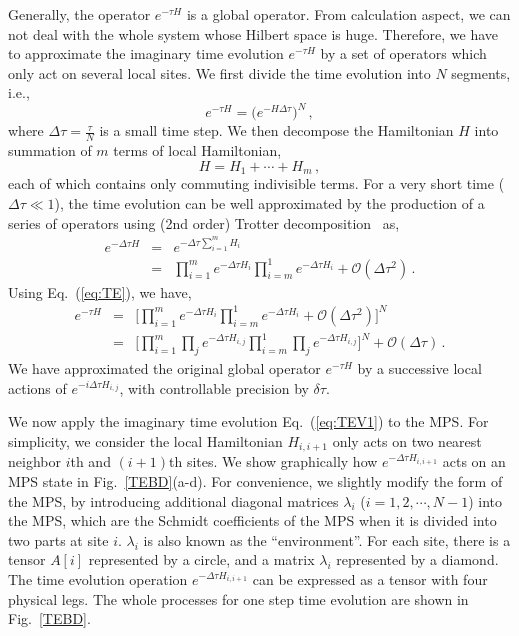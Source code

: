 \documentclass[preprint,3p,times,preprint,showpacs,amsmath,superscriptaddress,floatfix]{elsarticle}
\begin{document}
Generally, the operator $e^{-\tau H}$ is a global operator.
From calculation aspect, we can not deal with the whole system whose Hilbert space is huge. Therefore, we have to approximate the imaginary time evolution $e^{-\tau H}$ by a set of operators which only act on several local sites. We first divide the time evolution into $N$ segments, i.e.,
%
\begin{equation}
e^{-\tau H}=\big(e^{-H\Delta\tau}\big)^N \, ,
\label{eq:TE}
\end{equation}
where $\Delta\tau=\frac\tau N $ is a small time step.
%
We then decompose the Hamiltonian $H$ into summation of $m$ terms of local Hamiltonian,
\begin{equation}
	H=H_1+\cdots+H_m \, ,
\end{equation}
each of which contains only commuting indivisible terms.
%
For a very short time ($\Delta\tau\ll 1$), the time evolution can be well approximated by the production of a series of operators using (2nd order)
Trotter decomposition~\cite{Hatano2005} as,
%
\begin{eqnarray}\label{Trotter}
e^{-\Delta\tau H}&=&e^{-\Delta\tau \sum_{i=1}^mH_i}\\ \nonumber
&=&\prod_{i=1}^me^{-\Delta\tau H_{i}}\prod_{i=m}^1e^{-\Delta\tau H_{i}}+\mathcal O(\Delta\tau^2) \, .
\end{eqnarray}
%
Using Eq.~(\ref{eq:TE}), we have,
%
\begin{eqnarray}
\label{eq:TEV1}
e^{-\tau H}&=&\Big[\prod_{i=1}^me^{-\Delta\tau H_{i}}\prod_{i=m}^1e^{-\Delta\tau H_{i}}+\mathcal O(\Delta\tau^2)\Big]^N\\ \nonumber
&=&\Big[\prod_{i=1}^m\prod_je^{-\Delta\tau H_{i,j}}\prod_{i=m}^1\prod_je^{-\Delta\tau H_{i,j}}\Big]^N+\mathcal O(\Delta\tau) \, .
\end{eqnarray}
%
We have approximated the original global operator $e^{-\tau H}$ by a successive local actions of $e^{-i\Delta \tau H_{i,j}}$, with controllable precision by $\delta\tau$.

We now apply the imaginary time evolution Eq.~(\ref{eq:TEV1}) to the MPS\citep{Vidal2007}. For simplicity, we consider the local Hamiltonian $H_{i,i+1}$ only acts on two nearest neighbor $i$th and $(i+1)$th sites. We show graphically how $e^{-\Delta\tau H_{i,i+1}}$ acts on an MPS state in Fig.~\ref{TEBD}(a-d).
%
For convenience, we slightly modify the form of the MPS, by introducing additional diagonal matrices $\lambda_i$ ($i=1,2,\cdots, N-1$) into the MPS, which are the Schmidt coefficients of the MPS when it is divided into two parts at site $i$. $\lambda_i$  is also known as the ``environment''.
For each site, there is a tensor $A[i]$ represented by a circle, and a matrix $\lambda_i$ represented by a diamond.
The time evolution operation $e^{-\Delta\tau H_{i,i+1}}$ can be expressed as a tensor with four physical legs.
The whole processes for one step time evolution  are shown in Fig.~\ref{TEBD}.
\end{document}
